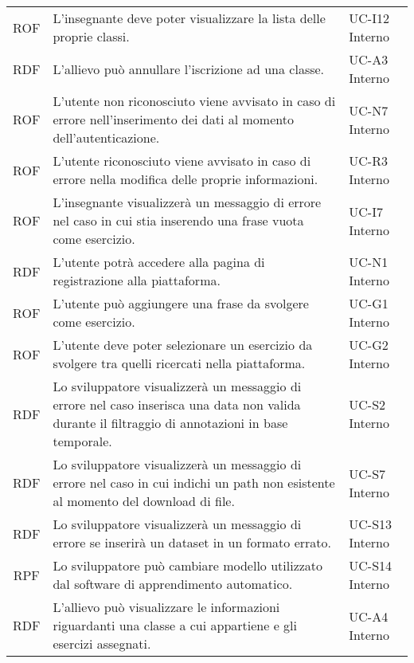 \begin{tabularx}{\textwidth}{| c | p{10cm} | X |}
		ROF & L'insegnante deve poter visualizzare la lista delle proprie classi. & UC-I12 \newline Interno\\
		RDF & L'allievo può annullare l'iscrizione ad una classe. & UC-A3 \newline Interno\\
		ROF & L'utente non riconosciuto viene avvisato in caso di errore nell'inserimento dei dati al momento dell'autenticazione. & UC-N7 \newline Interno\\
		ROF & L'utente riconosciuto viene avvisato in caso di errore nella modifica delle proprie informazioni. & UC-R3 \newline Interno\\
		ROF & L'insegnante visualizzerà un messaggio di errore nel caso in cui stia inserendo una frase vuota come esercizio. & UC-I7 \newline Interno\\
		RDF & L'utente potrà accedere alla pagina di registrazione alla piattaforma. & UC-N1 \newline Interno\\
		ROF & L'utente può aggiungere una frase da svolgere come esercizio. & UC-G1 \newline Interno\\
		ROF & L'utente deve poter selezionare un esercizio da svolgere tra quelli ricercati nella piattaforma. & UC-G2 \newline Interno\\
		RDF & Lo sviluppatore visualizzerà un messaggio di errore nel caso inserisca una data non valida durante il filtraggio di annotazioni in base temporale. & UC-S2 \newline Interno\\
		RDF & Lo sviluppatore visualizzerà un messaggio di errore nel caso in cui indichi un path non esistente al momento del download di file. & UC-S7 \newline Interno\\
		RDF & Lo sviluppatore visualizzerà un messaggio di errore se inserirà un dataset in un formato errato. & UC-S13 \newline Interno\\
		RPF & Lo sviluppatore può cambiare modello utilizzato dal software di apprendimento automatico. & UC-S14 \newline Interno\\
		RDF & L'allievo può visualizzare le informazioni riguardanti una classe a cui appartiene e gli esercizi assegnati. & UC-A4 \newline Interno\\

\end{tabularx}
